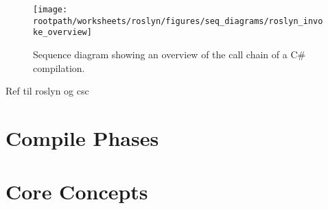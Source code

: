 \begin{sidewaysfigure}[htbp]
\centering
 \texttt{[image: \\rootpath/worksheets/roslyn/figures/seq\_diagrams/roslyn\_invoke\_overview]} 
 \caption{Sequence diagram showing an overview of the call chain of a C\# compilation.}
\label{fig:roslyn_invoke_overview}
\end{sidewaysfigure}







Ref til roslyn og csc 


\section{Compile Phases}




\section{Core Concepts}



